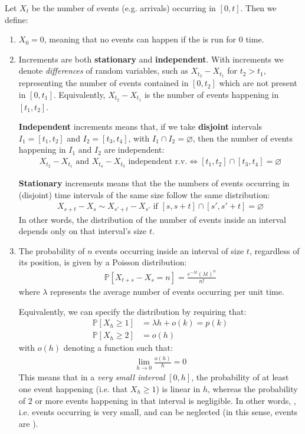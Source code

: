 \documentclass[../template.tex]{subfiles}
\begin{document}
Let $X_t$ be the number of events (e.g. arrivals) occurring in $[0,t]$. Then we define:
\begin{enumerate}
    \item $X_0 = 0$, meaning that no events can happen if the  is run for $0$ time.
    \item Increments are both \textbf{stationary} and \textbf{independent}. With increments we denote \textit{differences} of random variables, such as $X_{t_2} - X_{t_1}$ for $t_2 > t_1$, representing the number of events contained in $[0, t_2]$ which are not present in $[0,t_1]$. Equivalently, $X_{t_2}-X_{t_1}$ is the number of events happening in $[t_1, t_2]$.
    
    \medskip

    \textbf{Independent} increments means that, if we take \textbf{disjoint} intervals $I_1 = [t_1, t_2]$ and $I_2 = [t_3, t_4]$, with $I_1 \cap I_2 = \varnothing$, then the number of events happening in $I_1$ and $I_2$ are independent:
    \begin{align*}
        X_{t_2}-X_{t_1} \text{ and } X_{t_4}-X_{t_3} \text{ independent r.v.} \Leftrightarrow [t_1, t_2] \cap [t_3, t_4] = \varnothing 
    \end{align*}

    \textbf{Stationary} increments means that the the numbers of events occurring in (disjoint) time intervals of the same size follow the same distribution:
    \begin{align}\label{eqn:poisson-process}
        X_{s+t}-X_s \sim X_{s'+t}-X_{s'} \text{ if } [s,s+t] \cap [s', s'+t] = \varnothing
    \end{align}
    In other words, the distribution of the number of events inside an interval depends only on that interval's size $t$.
    \item The probability of $n$ events occurring inside an interval of size $t$, regardless of its position, is given by a Poisson distribution:
    \begin{align*}
        \mathbb{P}[X_{t+s} - X_s = n] = \frac{e^{-\lambda t}(\lambda t)^n}{n!} 
    \end{align*}
    where $\lambda$ represents the average number of events occurring per unit time.

    \medskip

    Equivalently, we can specify the distribution by requiring that:
    \begin{align*}
        \mathbb{P}[X_h \geq 1] &= \lambda h + o(k) = p(k)\\
        \mathbb{P}[X_h \geq 2] &= o(h)
    \end{align*}
    with $o(h)$ denoting a function such that:
    \begin{align*}
        \lim_{h \to 0} \frac{o(h)}{h} = 0 
    \end{align*}
    This means that in a \textit{very small interval} $[0,h]$, the probability of at least one event happening (i.e. that $X_h \geq 1$) is linear in $h$, whereas the probability of $2$ or more events happening in that interval is negligible. In other words, , i.e. events occurring  is very small, and can be neglected (in this sense, events are ).


\end{enumerate}
\end{document}

